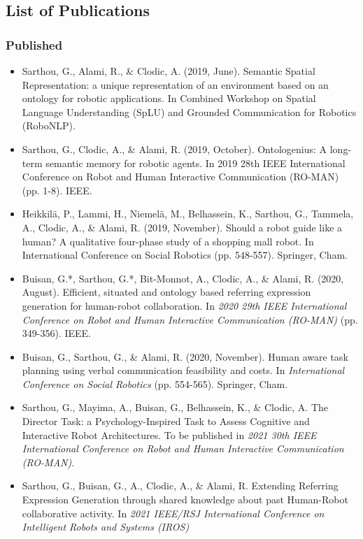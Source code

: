 \subsection*{List of Publications}
\subsubsection*{Published}
\begin{itemize}
\item Sarthou, G., Alami, R., \& Clodic, A. (2019, June). Semantic Spatial Representation: a unique representation of an environment based on an ontology for robotic applications. In Combined Workshop on Spatial Language Understanding (SpLU) and Grounded Communication for Robotics (RoboNLP).

\item Sarthou, G., Clodic, A., \& Alami, R. (2019, October). Ontologenius: A long-term semantic memory for robotic agents. In 2019 28th IEEE International Conference on Robot and Human Interactive Communication (RO-MAN) (pp. 1-8). IEEE.

\item Heikkilä, P., Lammi, H., Niemelä, M., Belhassein, K., Sarthou, G., Tammela, A., Clodic, A.,  \& Alami, R. (2019, November). Should a robot guide like a human? A qualitative four-phase study of a shopping mall robot. In International Conference on Social Robotics (pp. 548-557). Springer, Cham.

\item Buisan, G.*, Sarthou, G.*, Bit-Monnot, A., Clodic, A., \& Alami, R. (2020, August). Efficient, situated and ontology based referring expression generation for human-robot collaboration. In \textit{2020 29th IEEE International Conference on Robot and Human Interactive Communication (RO-MAN)} (pp. 349-356). IEEE.

\item Buisan, G., Sarthou, G., \& Alami, R. (2020, November). Human aware task planning using verbal communication feasibility and costs. In \textit{International Conference on Social Robotics} (pp. 554-565). Springer, Cham.

\item Sarthou, G., Mayima, A., Buisan, G., Belhassein, K., \& Clodic, A. The Director Task: a Psychology-Inspired Task to Assess Cognitive and Interactive Robot Architectures. To be published in \textit{2021 30th IEEE International Conference on Robot and Human Interactive Communication (RO-MAN)}.

\item Sarthou, G., Buisan, G., A., Clodic, A., \& Alami, R. Extending Referring Expression Generation through shared knowledge about past Human-Robot collaborative activity. In \textit{2021 IEEE/RSJ International Conference on Intelligent Robots and Systems (IROS)}
\end{itemize}

